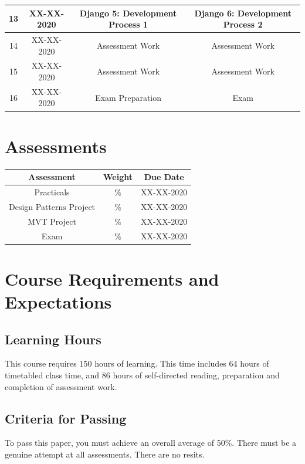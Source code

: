 \documentclass{article}
\begin{document}
\begin{tabular}{|c|c|c|c|}
	13            & XX-XX-2020    & Django 5: Development Process 1     & Django 6: Development Process 2 \\ \hline
	14            & XX-XX-2020    & Assessment Work                     & Assessment Work                 \\ \hline
	15            & XX-XX-2020    & Assessment Work                     & Assessment Work                 \\ \hline
	16            & XX-XX-2020    & Exam Preparation                    & Exam                            \\ \hline
\end{tabular}

\section*{Assessments}
\renewcommand{\arraystretch}{1.5}
\begin{tabular}{|c|c|c|}
	\hline
	\textbf{Assessment}     & \textbf{Weight} & \textbf{Due Date} \\ \hline
	Practicals              & \%              & XX-XX-2020        \\ \hline
	Design Patterns Project & \%              & XX-XX-2020        \\ \hline
	MVT Project         	& \%              & XX-XX-2020        \\ \hline
	Exam                    & \%              & XX-XX-2020        \\ \hline
\end{tabular}

\section*{Course Requirements and Expectations}

\subsection*{Learning Hours}
This course requires 150 hours of learning. This time includes 64 hours of timetabled class time, and 86 hours of self-directed reading, preparation and completion of assessment work.

\subsection*{Criteria for Passing}
To pass this paper, you must achieve an overall average of 50\%. There must be a genuine attempt at all assessments. There are no resits.
\end{document}
